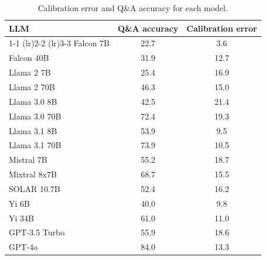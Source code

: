\begin{table}[h]
\caption{Calibration error and Q\&A accuracy for each model.}
\label{tab:calibration_truthfulqa_prob_max}
\centering
\begin{tabular}{lcc}
\toprule
LLM & Q\&A accuracy & Calibration error \\ 
\cmidrule(lr){1-1} \cmidrule(lr){2-2} \cmidrule(lr){3-3}
Falcon 7B & 22.7 & 3.6\\
Falcon 40B & 31.9 & 12.7\\
Llama 2 7B & 25.4 & 16.9\\
Llama 2 70B & 46.3 & 15.0\\
Llama 3.0 8B & 42.5 & 21.4\\
Llama 3.0 70B & 72.4 & 19.3\\
Llama 3.1 8B & 53.9 & 9.5\\
Llama 3.1 70B & 73.9 & 10.5\\
Mistral 7B & 55.2 & 18.7\\
Mixtral 8x7B & 68.7 & 15.5\\
SOLAR 10.7B & 52.4 & 16.2\\
Yi 6B & 40.0 & 9.8\\
Yi 34B & 61.0 & 11.0\\
GPT-3.5 Turbo & 55.9 & 18.6\\
GPT-4o & 84.0 & 13.3\\
\bottomrule
\end{tabular}
\end{table}
